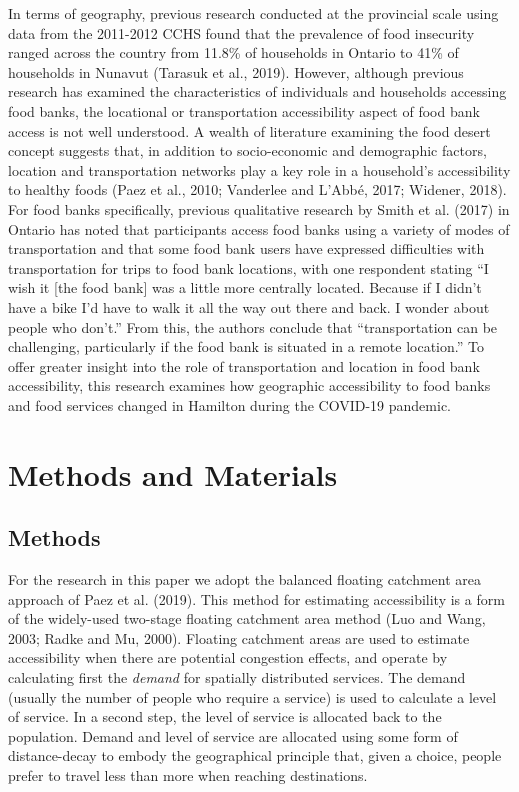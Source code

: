 \documentclass[]{elsarticle} %
\begin{document}
In terms of geography, previous research conducted at the provincial
scale using data from the 2011-2012 CCHS found that the prevalence of
food insecurity ranged across the country from 11.8\% of households in
Ontario to 41\% of households in Nunavut (Tarasuk et al., 2019).
However, although previous research has examined the characteristics of
individuals and households accessing food banks, the locational or
transportation accessibility aspect of food bank access is not well
understood. A wealth of literature examining the food desert concept
suggests that, in addition to socio-economic and demographic factors,
location and transportation networks play a key role in a household's
accessibility to healthy foods (Paez et al., 2010; Vanderlee and L'Abbé,
2017; Widener, 2018). For food banks specifically, previous qualitative
research by Smith et al. (2017) in Ontario has noted that participants
access food banks using a variety of modes of transportation and that
some food bank users have expressed difficulties with transportation for
trips to food bank locations, with one respondent stating ``I wish it
{[}the food bank{]} was a little more centrally located. Because if I
didn't have a bike I'd have to walk it all the way out there and back. I
wonder about people who don't.'' From this, the authors conclude that
``transportation can be challenging, particularly if the food bank is
situated in a remote location.'' To offer greater insight into the role
of transportation and location in food bank accessibility, this research
examines how geographic accessibility to food banks and food services
changed in Hamilton during the COVID-19 pandemic.

\hypertarget{methods-and-materials}{%
\section{Methods and Materials}\label{methods-and-materials}}

\hypertarget{methods}{%
\subsection{Methods}\label{methods}}

For the research in this paper we adopt the balanced floating catchment
area approach of Paez et al. (2019). This method for estimating
accessibility is a form of the widely-used two-stage floating catchment
area method (Luo and Wang, 2003; Radke and Mu, 2000). Floating catchment
areas are used to estimate accessibility when there are potential
congestion effects, and operate by calculating first the \emph{demand}
for spatially distributed services. The demand (usually the number of
people who require a service) is used to calculate a level of service.
In a second step, the level of service is allocated back to the
population. Demand and level of service are allocated using some form of
distance-decay to embody the geographical principle that, given a
choice, people prefer to travel less than more when reaching
destinations.
\end{document}

